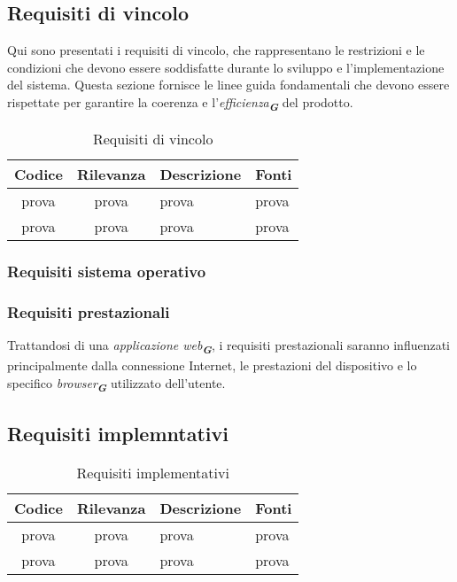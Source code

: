 \subsection{Requisiti di vincolo}
Qui sono presentati i requisiti di vincolo, che rappresentano le restrizioni e le condizioni
che devono essere soddisfatte durante lo sviluppo e l'implementazione del sistema. Questa
sezione fornisce le linee guida fondamentali che devono essere rispettate per garantire la
coerenza e l'\emph{efficienza}\textsubscript{\textit{\textbf{G}}} del prodotto.
\begin{table}[h!]
    \centering
    \renewcommand{\arraystretch}{1.6} %
    \begin{tabularx}{\textwidth}{|>{\centering\arraybackslash}c|>{\centering\arraybackslash}c|>{\centering\arraybackslash}X|>{\centering\arraybackslash}p{3cm}|} \hline
    \rowcolor[HTML]{FFD700} 
    \textbf{Codice} & \textbf{Rilevanza} & \textbf{Descrizione} & \textbf{Fonti} \\ \hline
    prova & prova & prova & prova \\ \hline
    prova & prova & prova & prova \\ \hline
    \end{tabularx}
    \caption{Requisiti di vincolo}
    \label{tab:Requisiti_di_vincolo}
\end{table}

\subsubsection{Requisiti sistema operativo}

\subsubsection{Requisiti prestazionali}
Trattandosi di una \emph{applicazione web}\textsubscript{\textit{\textbf{G}}}, i requisiti prestazionali saranno influenzati principalmente dalla connessione Internet, 
le prestazioni del dispositivo e lo specifico \emph{browser}\textsubscript{\textit{\textbf{G}}} utilizzato dell'utente.


\subsection{Requisiti implemntativi}
\label{sec:Requisiti_implemntativi}
\begin{table}[h!]
    \centering
    \renewcommand{\arraystretch}{1.6} %
    \begin{tabularx}{\textwidth}{|>{\centering\arraybackslash}c|>{\centering\arraybackslash}c|>{\centering\arraybackslash}X|>{\centering\arraybackslash}p{3cm}|} \hline
    \rowcolor[HTML]{FFD700} 
    \textbf{Codice} & \textbf{Rilevanza} & \textbf{Descrizione} & \textbf{Fonti} \\ \hline
    prova & prova & prova & prova \\ \hline
    prova & prova & prova & prova \\ \hline
    \end{tabularx}
    \caption{Requisiti implementativi}
    \label{tab:Requisiti_implementativi}
\end{table}


